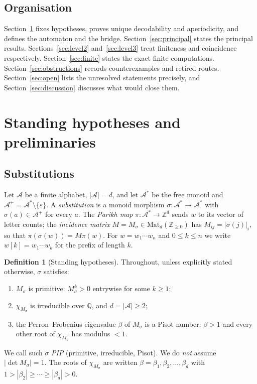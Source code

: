 \documentclass[11pt]{amsart}
\theoremstyle{plain}
\theoremstyle{definition}
\newtheorem{definition}[theorem]{Definition}
\theoremstyle{remark}
\newcommand{\Z}{\mathbb{Z}}
\newcommand{\Q}{\mathbb{Q}}
\newcommand{\A}{\mathcal{A}}
\begin{document}
\subsection{Organisation}
Section~\ref{sec:prelim} fixes hypotheses, proves unique decodability and aperiodicity, and defines the automaton and the bridge. Section~\ref{sec:principal} states the principal results. Sections~\ref{sec:level2} and~\ref{sec:level3} treat finiteness and coincidence respectively. Section~\ref{sec:finite} states the exact finite computations. Section~\ref{sec:obstructions} records counterexamples and retired routes. Section~\ref{sec:open} lists the unresolved statements precisely, and Section~\ref{sec:discussion} discusses what would close them.

\section{Standing hypotheses and preliminaries}\label{sec:prelim}

\subsection{Substitutions}
Let $\A$ be a finite alphabet, $|\A|=d$, and let $\A^*$ be the free monoid and $\A^+=\A^*\setminus\{\varepsilon\}$. A \emph{substitution} is a monoid morphism $\sigma:\A^*\to\A^*$ with $\sigma(a)\in\A^+$ for every $a$. The \emph{Parikh map} $\pi:\A^*\to\Z^d$ sends $w$ to its vector of letter counts; the \emph{incidence matrix} $M=M_\sigma\in\mathrm{Mat}_d(\Z_{\ge0})$ has $M_{ij}=|\sigma(j)|_i$, so that $\pi(\sigma(w))=M\pi(w)$. For $w=w_1\cdots w_n$ and $0\le k\le n$ we write $w[k]=w_1\cdots w_k$ for the prefix of length $k$.

\begin{definition}[Standing hypotheses]\label{def:standing}
Throughout, unless explicitly stated otherwise, $\sigma$ satisfies:
\begin{enumerate}[label=(H\arabic*)]
\item\label{H1} $M_\sigma$ is primitive: $M_\sigma^k>0$ entrywise for some $k\ge1$;
\item\label{H2} $\chi_{M_\sigma}$ is irreducible over $\Q$, and $d=|\A|\ge 2$;
\item\label{H3} the Perron--Frobenius eigenvalue $\beta$ of $M_\sigma$ is a Pisot number: $\beta>1$ and every other root of $\chi_{M_\sigma}$ has modulus $<1$.
\end{enumerate}
We call such $\sigma$ \emph{PIP} (primitive, irreducible, Pisot). We do \emph{not} assume $|\det M_\sigma|=1$. The roots of $\chi_{M_\sigma}$ are written $\beta=\beta_1,\beta_2,\dots,\beta_d$ with $1>|\beta_2|\ge\cdots\ge|\beta_d|>0$.
\end{definition}
\end{document}
